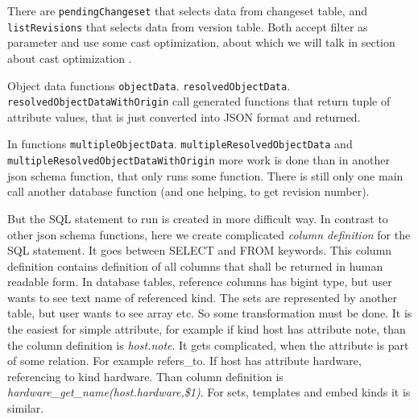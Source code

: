 \documentclass[deska]{subfiles}
\begin{document}
There are {\tt pendingChangeset} that selects data from changeset table, and {\tt listRevisions} that selects data from version table.
Both accept filter as parameter and use some cast optimization, about which we will talk in section about cast
optimization .

Object data functions {\tt objectData}. {\tt resolvedObjectData}. {\tt resolvedObjectDataWithOrigin} call generated functions 
that return tuple of attribute values, that is just converted into JSON format and returned. 

In functions {\tt multipleObjectData}. {\tt multipleResolvedObjectData} and {\tt multipleResolvedObjectDataWithOrigin}
more work is done than in another json schema function, that only runs some function.
There is still only one main call another database function (and one helping, to get revision number).

But the SQL statement to run is created in more difficult way. In contrast to other json schema functions,
here we create complicated {\em column definition} for the SQL statement. It goes between SELECT and FROM keywords.
This column definition contains definition of all columns that shall be returned in human readable form.
In database tables, reference columns has bigint type, but user wants to see text name of referenced kind.
The sets are represented by another table, but user wants to see array etc. So some transformation must be done.
It is the easiest for simple attribute,
for example if kind host has attribute note, than the column definition is {\em host.note}.
It gets complicated, when the attribute is part of some relation. For example refers\_to.
If host has attribute hardware, referencing to kind hardware. Than column definition is 
{\em hardware\_get\_name(host.hardware,\$1)}. For sets, templates and embed kinds it is similar.
\end{document}
